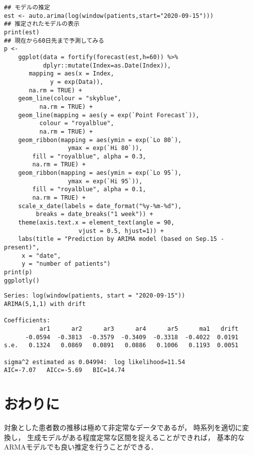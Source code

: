 \documentclass[10pt,oneside,fleqn]{scrartcl}
\begin{document}
\begin{verbatim}
## モデルの推定
est <- auto.arima(log(window(patients,start="2020-09-15")))
## 推定されたモデルの表示
print(est)
## 現在から60日先まで予測してみる
p <- 
    ggplot(data = fortify(forecast(est,h=60)) %>%
	       dplyr::mutate(Index=as.Date(Index)),
	   mapping = aes(x = Index,
			 y = exp(Data)),
	   na.rm = TRUE) +
    geom_line(colour = "skyblue",
	      na.rm = TRUE) +
    geom_line(mapping = aes(y = exp(`Point Forecast`)),
	      colour = "royalblue",
	      na.rm = TRUE) +
    geom_ribbon(mapping = aes(ymin = exp(`Lo 80`),
			      ymax = exp(`Hi 80`)),
		fill = "royalblue", alpha = 0.3,
		na.rm = TRUE) +
    geom_ribbon(mapping = aes(ymin = exp(`Lo 95`),
			      ymax = exp(`Hi 95`)),
		fill = "royalblue", alpha = 0.1,
		na.rm = TRUE) +
    scale_x_date(labels = date_format("%y-%m-%d"), 
		 breaks = date_breaks("1 week")) + 
    theme(axis.text.x = element_text(angle = 90,
				     vjust = 0.5, hjust=1)) +
    labs(title = "Prediction by ARIMA model (based on Sep.15 - present)",
	 x = "date",
	 y = "number of patients")
print(p)
ggplotly()
\end{verbatim}

\begin{verbatim}
Series: log(window(patients, start = "2020-09-15")) 
ARIMA(5,1,1) with drift 

Coefficients:
          ar1      ar2      ar3      ar4      ar5      ma1   drift
      -0.0594  -0.3813  -0.3579  -0.3409  -0.3318  -0.4022  0.0191
s.e.   0.1324   0.0869   0.0891   0.0886   0.1006   0.1193  0.0051

sigma^2 estimated as 0.04994:  log likelihood=11.54
AIC=-7.07   AICc=-5.69   BIC=14.74
\end{verbatim}

\section{おわりに}
\label{sec:org22e2aab}

対象とした患者数の推移は極めて非定常なデータであるが，
時系列を適切に変換し，
生成モデルがある程度定常な区間を捉えることができれば，
基本的なARMAモデルでも良い推定を行うことができる．
\end{document}
